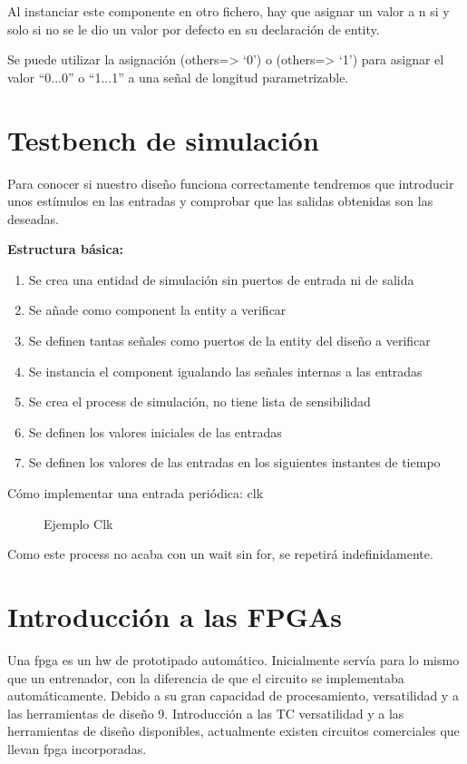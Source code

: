 Al instanciar este componente en otro fichero, hay que asignar un valor a n si y solo si no se le dio un valor por defecto en su declaración de entity.

Se  puede  utilizar  la  asignación (others=> ‘0’) o (others=> ‘1’) para asignar el valor “0...0” o “1...1” a una señal de longitud parametrizable.

\section{Testbench de simulación}
Para conocer si nuestro diseño funciona correctamente tendremos que introducir unos estímulos en las entradas y comprobar que las salidas obtenidas son las deseadas.

\textbf{Estructura básica:}
\begin{enumerate}
	\item Se crea una entidad de simulación sin puertos de entrada ni de salida
	\item Se añade como component la entity a verificar
	\item Se definen tantas señales como puertos de la entity del diseño a verificar
	\item Se instancia el component igualando las señales internas a las entradas
	\item Se crea el process de simulación, no tiene lista de sensibilidad
	\item Se definen los valores iniciales de las entradas
	\item Se definen los valores de las entradas en los siguientes instantes de tiempo
\end{enumerate}

Cómo implementar una entrada periódica: clk
\begin{figure}[H]
	\centering
	
	\caption{Ejemplo Clk}
\end{figure}

Como este process no acaba con un wait sin for, se repetirá indefinidamente.


\section{Introducción a las FPGAs}
Una \gls{fpga} es un \gls{hw} de prototipado automático. Inicialmente servía para lo mismo que un entrenador, con la diferencia de que el circuito se implementaba automáticamente. Debido a su gran capacidad de procesamiento, versatilidad y a las herramientas de diseño 9. Introducción a las TC versatilidad y a las herramientas de diseño disponibles, actualmente existen circuitos comerciales que llevan \gls{fpga} incorporadas.


